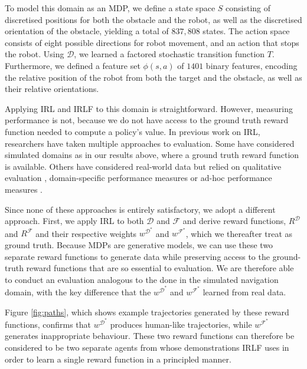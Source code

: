 \documentclass{aamas2016}
\begin{document}
To model this domain as an MDP, we define a state space $S$ consisting of discretised positions for both the obstacle and the robot, as well as the discretised orientation of the obstacle, yielding a total of $837,808$ states. The action space consists of eight possible directions for robot movement, and an action that stops the robot. Using $\mathcal{D}$, we learned a factored stochastic transition function $T$. Furthermore, we defined a feature set $\phi(s,a)$ of $1401$ binary features, encoding the relative position of the robot from both the target and the obstacle, as well as their relative orientations. 

Applying IRL and IRLF to this domain is straightforward.  However, measuring performance is not, because we do not have access to the ground truth reward function needed to compute a policy's value. In previous work on IRL, researchers have taken multiple approaches to evaluation.  Some have considered simulated domains \cite{levine2011nonlinear,syed2007game,rothkopf2011preference} as in our results above, where a ground truth reward function is available. Others have considered real-world data but relied on qualitative evaluation \cite{ratliff2006maximum}, domain-specific performance measures \cite{neu2009training} or ad-hoc performance measures \cite{vasquez2014inverse}.

Since none of these approaches is entirely satisfactory, we adopt a different approach. First, we apply IRL to both $\mathcal{D}$ and $\mathcal{F}$ and derive reward functions, $R^{\mathcal{D}}$ and $R^{\mathcal{F}}$ and their respective weights $w^{\mathcal{D}^*}$ and $w^{\mathcal{F}^*}$, which we thereafter treat as ground truth.
Because MDPs are generative models, we can use these two separate reward functions to generate data while preserving access to the ground-truth reward functions that are so essential to evaluation. We are therefore able to conduct an evaluation analogous to the done in the simulated navigation domain, with the key difference that the $w^{\mathcal{D}^*}$ and $w^{\mathcal{F}^*}$ learned from real data. 

Figure \ref{fig:paths}, which shows example trajectories generated by these reward functions, confirms that $w^{\mathcal{D}^*}$ produces human-like trajectories, while $w^{\mathcal{F}^*}$ generates inappropriate behaviour. These two reward functions can therefore be considered to be two separate agents from whose demonstrations IRLF uses in order to learn a single reward function in a principled manner.
\end{document}
